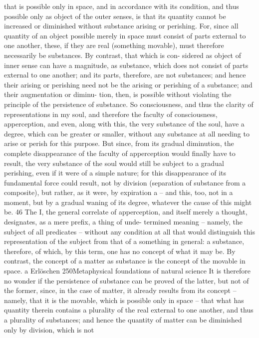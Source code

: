 that is possible only in space, and in accordance with its condition, and
thus possible only as object of the outer senses, is that its quantity cannot
be increased or diminished without substance arising or perishing. For,
since all quantity of an object possible merely in space must consist of
parts external to one another, these, if they are real (something movable),
must therefore necessarily be substances. By contrast, that which is con-
sidered as object of inner sense can have a magnitude, as substance, which
does not consist of parts external to one another; and its parts, therefore, are
not substances; and hence their arising or perishing need not be the
arising or perishing of a substance; and their augmentation or diminu-
tion, then, is possible without violating the principle of the persistence
of substance. So consciousness, and thus the clarity of representations in
my soul, and therefore the faculty of consciousness, apperception, and
even, along with this, the very substance of the soul, have a degree, which
can be greater or smaller, without any substance at all needing to arise
or perish for this purpose. But since, from its gradual diminution, the
complete disappearance of the faculty of apperception would ﬁnally have
to result, the very substance of the soul would still be subject to a gradual
perishing, even if it were of a simple nature; for this disappearance of its
fundamental force could result, not by division (separation of substance
from a composite), but rather, as it were, by expiration a – and this, too,
not in a moment, but by a gradual waning of its degree, whatever the
cause of this might be. 46 The I, the general correlate of apperception,
and itself merely a thought, designates, as a mere preﬁx, a thing of unde-
termined meaning – namely, the subject of all predicates – without any
condition at all that would distinguish this representation of the subject
from that of a something in general: a substance, therefore, of which,
by this term, one has no concept of what it may be. By contrast, the
concept of a matter as substance is the concept of the movable in space.
a
Erlöschen
250Metaphysical foundations of natural science
It is therefore no wonder if the persistence of substance can be proved
of the latter, but not of the former, since, in the case of matter, it already
results from its concept – namely, that it is the movable, which is possible
only in space – that what has quantity therein contains a plurality of the
real external to one another, and thus a plurality of substances; and hence
the quantity of matter can be diminished only by division, which is not
